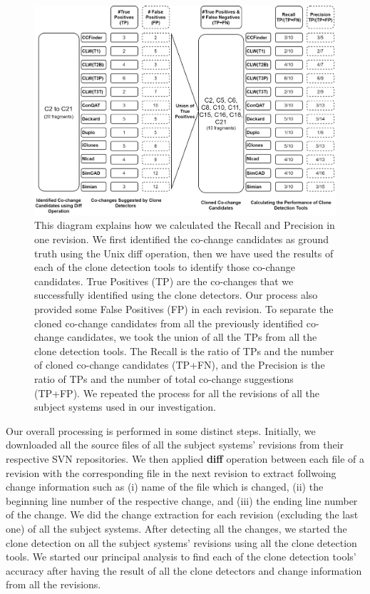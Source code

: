 \documentclass[review]{elsarticle}
\begin{document}

\vspace{4mm}
\begin{figure}
\centering
\includegraphics[width=\columnwidth] {CalculatingCC.jpg}
\caption{This diagram explains how we calculated the Recall and Precision in one revision. We first identified the co-change candidates as ground truth using the Unix diff operation, then we have used the results of each of the clone detection tools to identify those co-change candidates. True Positives (TP) are the co-changes that we successfully identified using the clone detectors. Our process also provided some False Positives (FP) in each revision. To separate the cloned co-change candidates from all the previously identified co-change candidates, we took the union of all the TPs from all the clone detection tools. The Recall is the ratio of TPs and the number of cloned co-change candidates (TP+FN), and the Precision is the ratio of TPs and the number of total co-change suggestions (TP+FP). We repeated the process for all the revisions of all the subject systems used in our investigation.}
\label{fig:CalculatingCC}
\end{figure}

Our overall processing is performed in some distinct steps.  Initially, we downloaded all the source files of all the subject systems' revisions from their respective SVN repositories. We then applied \textbf{diff} operation between each file of a revision with the corresponding file in the next revision to extract follwoing change information such as (i) name of the file which is changed, (ii) the beginning line number of the respective change, and (iii) the ending line number of the change. We did the change extraction for each revision (excluding the last one) of all the subject systems. After detecting all the changes, we started the clone detection on all the subject systems' revisions using all the clone detection tools. We started our principal analysis to find each of the clone detection tools' accuracy after having the result of all the clone detectors and change information from all the revisions. 
\end{document}
